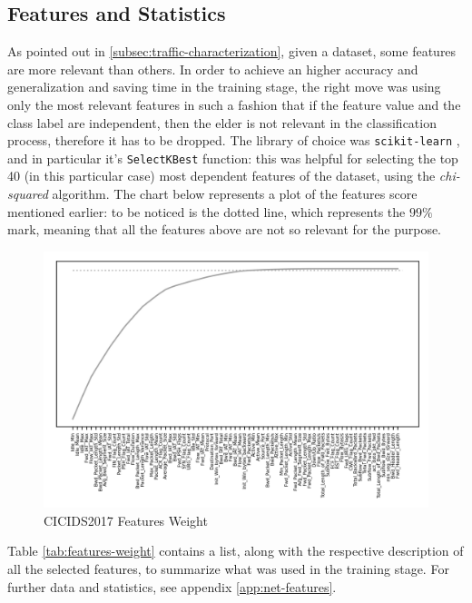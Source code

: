 
\subsection{Features and Statistics}
\label{subsec:features-statistics}

As pointed out in \ref{subsec:traffic-characterization}, given a dataset, some features are more relevant than others. In order to achieve an higher accuracy and generalization and saving time in the training stage, the right move was using only the most relevant features in such a fashion that if the feature value and the class label are independent, then the elder is not relevant in the classification process, therefore it has to be dropped. The library of choice was \texttt{scikit-learn} \cite{ScikitWebsite}, and in particular it's \texttt{SelectKBest} function: this was helpful for selecting the top 40 (in this particular case) most dependent features of the dataset, using the \textit{chi-squared} algorithm. The chart below represents a plot of the features score mentioned earlier: to be noticed is the dotted line, which represents the $99\%$ mark, meaning that all the features above are not so relevant for the purpose.

\begin{figure}[h!]
    \centering
    \includegraphics[scale=0.99]{assets/figures/chapter3/features99.png}
    \caption{CICIDS2017 Features Weight}
    \label{fig:features-weight}
\end{figure}

\noindent Table \ref{tab:features-weight} contains a list, along with the respective description of all the selected features, to summarize what was used in the training stage. For further data and statistics, see appendix \ref{app:net-features}.

